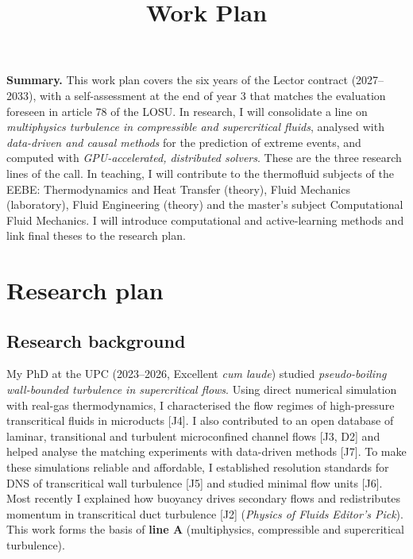 \documentclass[11pt]{article}
\title{\textbf{Work Plan}}
\author{\Large \CandName}
\date{}
\begin{document}
\maketitle
\thispagestyle{plain}
\vspace{0.5cm}
\begin{center}\postdata\end{center}

\vspace{0.8cm}
\noindent\textbf{Summary.}
This work plan covers the six years of the Lector contract (2027--2033), with a
self-assessment at the end of year 3 that matches the evaluation foreseen in article 78
of the LOSU. In research, I will consolidate a line on \emph{multiphysics turbulence in
compressible and supercritical fluids}, analysed with \emph{data-driven and causal
methods} for the prediction of extreme events, and computed with \emph{GPU-accelerated,
distributed solvers}. These are the three research lines of the call. In teaching, I will
contribute to the thermofluid subjects of the EEBE: Thermodynamics and Heat Transfer
(theory), Fluid Mechanics (laboratory), Fluid Engineering (theory) and the master's
subject Computational Fluid Mechanics. I will introduce computational and active-learning
methods and link final theses to the research plan.

\newpage
\tableofcontents
\newpage

\section{Research plan}

\subsection{Research background}
My PhD at the UPC (2023--2026, Excellent \emph{cum laude}) studied \emph{pseudo-boiling
wall-bounded turbulence in supercritical flows}. Using direct numerical simulation with
real-gas thermodynamics, I characterised the flow regimes of high-pressure transcritical
fluids in microducts [J4]. I also contributed to an open database of laminar, transitional
and turbulent microconfined channel flows [J3, D2] and helped analyse the matching
experiments with data-driven methods [J7]. To make these simulations reliable and
affordable, I established resolution standards for DNS of transcritical wall turbulence
[J5] and studied minimal flow units [J6]. Most recently I explained how buoyancy drives
secondary flows and redistributes momentum in transcritical duct turbulence [J2]
(\emph{Physics of Fluids} \emph{Editor's Pick}). This work forms the basis of \textbf{line A}
(multiphysics, compressible and supercritical turbulence).
\end{document}
